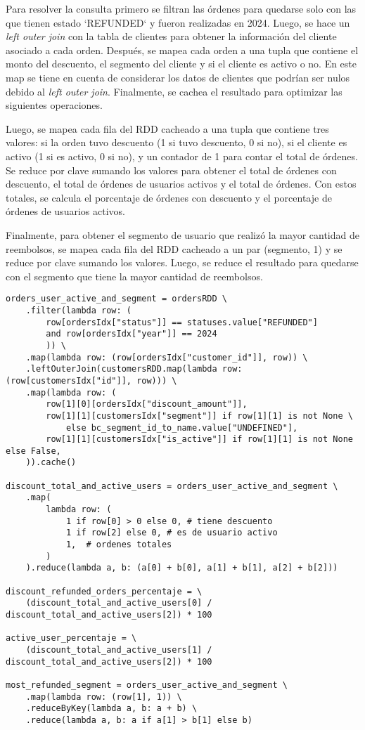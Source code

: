 Para resolver la consulta primero se filtran las órdenes para quedarse solo con las que tienen estado `REFUNDED` y fueron realizadas en 2024. Luego, se hace un \textit{left outer join} con la tabla de clientes para obtener la información del cliente asociado a cada orden. Después, se mapea cada orden a una tupla que contiene el monto del descuento, el segmento del cliente y si el cliente es activo o no. En este map se tiene en cuenta de considerar los datos de clientes que podrían ser nulos debido al \textit{left outer join}. Finalmente, se cachea el resultado para optimizar las siguientes operaciones.

Luego, se mapea cada fila del RDD cacheado a una tupla que contiene tres valores: si la orden tuvo descuento (1 si tuvo descuento, 0 si no), si el cliente es activo (1 si es activo, 0 si no), y un contador de 1 para contar el total de órdenes. Se reduce por clave sumando los valores para obtener el total de órdenes con descuento, el total de órdenes de usuarios activos y el total de órdenes. Con estos totales, se calcula el porcentaje de órdenes con descuento y el porcentaje de órdenes de usuarios activos.

Finalmente, para obtener el segmento de usuario que realizó la mayor cantidad de reembolsos, se mapea cada fila del RDD cacheado a un par (segmento, 1) y se reduce por clave sumando los valores. Luego, se reduce el resultado para quedarse con el segmento que tiene la mayor cantidad de reembolsos.

\begin{lstlisting}[caption={Resolución de la consulta 2 propuesta propia.}, xleftmargin=20pt, xrightmargin=20pt]
orders_user_active_and_segment = ordersRDD \
    .filter(lambda row: (
        row[ordersIdx["status"]] == statuses.value["REFUNDED"] 
        and row[ordersIdx["year"]] == 2024
        )) \
    .map(lambda row: (row[ordersIdx["customer_id"]], row)) \
    .leftOuterJoin(customersRDD.map(lambda row: (row[customersIdx["id"]], row))) \
    .map(lambda row: (
        row[1][0][ordersIdx["discount_amount"]],
        row[1][1][customersIdx["segment"]] if row[1][1] is not None \
            else bc_segment_id_to_name.value["UNDEFINED"],
        row[1][1][customersIdx["is_active"]] if row[1][1] is not None else False,
    )).cache()

discount_total_and_active_users = orders_user_active_and_segment \
    .map(
        lambda row: (
            1 if row[0] > 0 else 0, # tiene descuento
            1 if row[2] else 0, # es de usuario activo
            1,  # ordenes totales
        )
    ).reduce(lambda a, b: (a[0] + b[0], a[1] + b[1], a[2] + b[2]))

discount_refunded_orders_percentaje = \
    (discount_total_and_active_users[0] / discount_total_and_active_users[2]) * 100

active_user_percentaje = \ 
    (discount_total_and_active_users[1] / discount_total_and_active_users[2]) * 100

most_refunded_segment = orders_user_active_and_segment \
    .map(lambda row: (row[1], 1)) \
    .reduceByKey(lambda a, b: a + b) \
    .reduce(lambda a, b: a if a[1] > b[1] else b)
\end{lstlisting}

